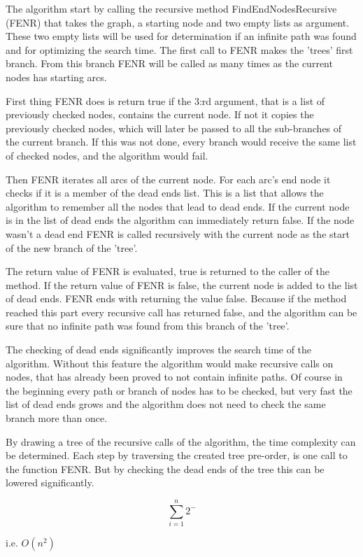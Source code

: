 \documentclass[]{article}
\begin{document}
The algorithm start by calling the recursive method FindEndNodesRecursive (FENR) that takes the graph, a starting node and two empty lists as argument. These two empty lists will be used for determination if an infinite path was found and for optimizing the search time. The first call to FENR makes the 'trees' first branch. From this branch FENR will be called as many times as the current nodes has starting arcs. 

First thing FENR does is return true if the 3:rd argument, that is a list of previously checked nodes, contains the current node. If not it copies the previously checked nodes, which will later be passed to all the sub-branches of the current branch. If this was not done, every branch would receive the same list of checked nodes, and the algorithm would fail. 

Then FENR iterates all arcs of the current node. For each arc's end node it checks if it is a member of the dead ends list. This is a list that allows the algorithm to remember all the nodes that lead to dead ends. If the current node is in the list of dead ends the algorithm can immediately return false. If the node wasn't a dead end FENR is called recursively with the current node as the start of the new branch of the 'tree'.

The return value of FENR is evaluated, true is returned to the caller of the method. If the return value of FENR is false, the current node is added to the list of dead ends. FENR ends with returning the value false. Because if the method reached this part every recursive call has returned false, and the algorithm can be sure that no infinite path was found from this branch of the 'tree'.

The checking of dead ends significantly improves the search time of the algorithm. Without this feature the algorithm would make recursive calls on nodes, that has already been proved to not contain infinite paths. Of course in the beginning every path or branch of nodes has to be checked, but very fast the list of dead ends grows and the algorithm does not need to check the same branch more than once.

By drawing a tree of the recursive calls of the algorithm, the time complexity can be determined. Each step by traversing the created tree pre-order, is one call to the function FENR. But by checking the dead ends of the tree this can be lowered significantly.

$$\sum_{i=1}^{n} 2^{-}$$ 

i.e. $O(n^2)$ 
\end{document}
